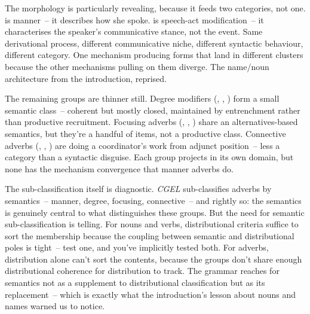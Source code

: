 The  morphology is particularly revealing, because it feeds two categories, not one.  is manner~-- it describes how she spoke.  is speech-act modification~-- it characterises the speaker's communicative stance, not the event. Same derivational process, different communicative niche, different syntactic behaviour, different category. One mechanism producing forms that land in different clusters because the other mechanisms pulling on them diverge. The name/noun architecture from the introduction, reprised.

The remaining groups are thinner still. Degree modifiers (, , ) form a small semantic class~-- coherent but mostly closed, maintained by entrenchment rather than productive recruitment. Focusing adverbs (, , ) share an alternatives-based semantics, but they're a handful of items, not a productive class. Connective adverbs (, , ) are doing a coordinator's work from adjunct position~-- less a category than a syntactic disguise. Each group projects in its own domain, but none has the mechanism convergence that manner adverbs do.

The sub-classification itself is diagnostic. \textit{CGEL} sub-classifies adverbs by semantics~-- manner, degree, focusing, connective~-- and rightly so: the semantics is genuinely central to what distinguishes these groups. But the need for semantic sub-classification is telling. For nouns and verbs, distributional criteria suffice to sort the membership because the coupling between semantic and distributional poles is tight~-- test one, and you've implicitly tested both. For adverbs, distribution alone can't sort the contents, because the groups don't share enough distributional coherence for distribution to track. The grammar reaches for semantics not as a supplement to distributional classification but as its replacement~-- which is exactly what the introduction's lesson about nouns and names warned us to notice.

